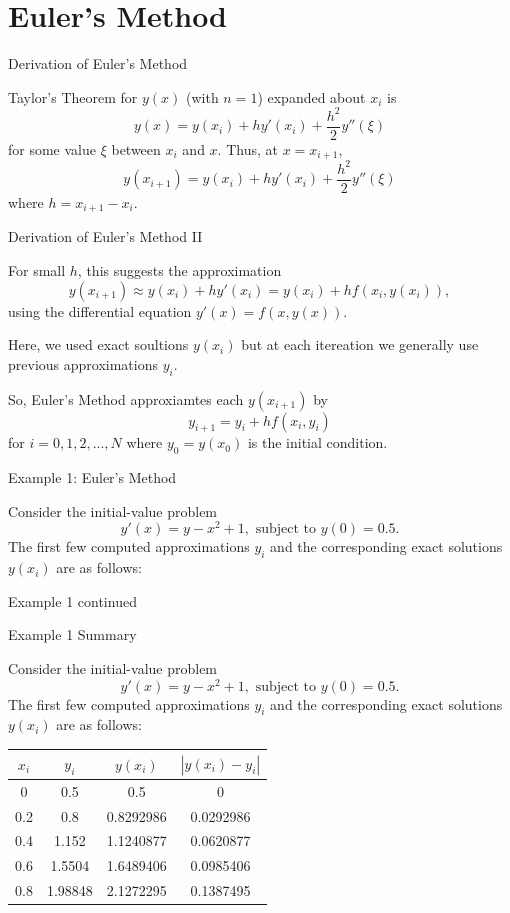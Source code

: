 \documentclass[12pt]{beamer}
\begin{document}
\section{Euler's Method}


\begin{frame}{Derivation of Euler's Method}

Taylor's Theorem for $y(x)$ (with $n=1$) expanded about $x_i$ is
\[
y(x)=y(x_i)+hy'(x_i)+\frac{h^2}{2}y''(\xi)
 \]
for some value $\xi$ between $x_i$ and $x$.  Thus, at $x=x_{i+1}$,
\[
y(x_{i+1})=y(x_i)+hy'(x_i)+\frac{h^2}{2}y''(\xi)
\]
where $h=x_{i+1}-x_i$.

\end{frame}

\begin{frame}{Derivation of Euler's Method II}

For small $h$, this suggests the approximation
\[
y(x_{i+1}) \approx y(x_i)+hy'(x_i)
=y(x_i)+hf(x_i,y(x_i)),
 \]
using the differential equation $y'(x)=f(x,y(x))$. 

Here, we used exact soultions $y(x_i)$ but at each itereation we generally use previous approximations $y_i$. 

So, Euler's Method approxiamtes each $y(x_{i+1})$ by
\[
y_{i+1}=y_i+hf(x_i,y_i)
\]
for $i=0,1,2,...,N$ where $y_0=y(x_0)$ is the initial condition.

\end{frame}

\begin{frame}{Example 1: Euler's Method}

Consider the initial-value problem
\[
y'(x)=y-x^2+1, \text{ subject to } y(0)=0.5.
\]
The first few computed approximations $y_i$ and the corresponding exact solutions $y(x_i)$ are as follows:
\vspace{3 in}
\end{frame}

\begin{frame}{Example 1 continued}

\end{frame}

\begin{frame}{Example 1 Summary}

Consider the initial-value problem
\[
y'(x)=y-x^2+1, \text{ subject to } y(0)=0.5.
\]
The first few computed approximations $y_i$ and the corresponding exact solutions $y(x_i)$ are as follows:

\begin{center}
\begin{tabular}{c|c|c|c}
$x_i$ & $y_i$ & $y(x_i)$ & $|y(x_i)-y_i|$ \\
\hline
0 & 0.5 & 0.5 & 0 \\
0.2 & 0.8 & 0.8292986 & 0.0292986 \\
0.4 & 1.152 & 1.1240877 & 0.0620877 \\
0.6 & 1.5504 & 1.6489406 & 0.0985406 \\
0.8 & 1.98848 & 2.1272295 & 0.1387495
\end{tabular}
\end{center}

\end{frame}
\end{document}
